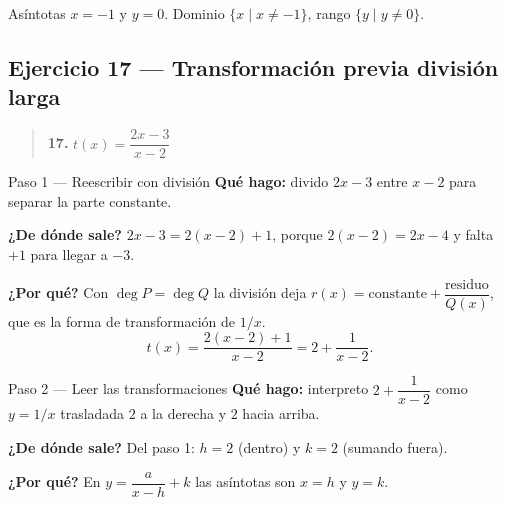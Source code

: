 \documentclass[11pt]{article}
\begin{document}
\begin{center}
\end{center}

\begin{resp}
Asíntotas $x=-1$ y $y=0$. Dominio $\{x\mid x\ne -1\}$, rango $\{y\mid y\ne 0\}$.
\end{resp}

\subsection*{Ejercicio 17 — Transformación previa división larga}

\begin{quote}
\textbf{17.} $t(x)=\dfrac{2x-3}{x-2}$
\end{quote}

\begin{paso}{Paso 1 --- Reescribir con división}
\textbf{Qué hago:} divido $2x-3$ entre $x-2$ para separar la parte constante.

\textbf{¿De dónde sale?} $2x-3=2(x-2)+1$, porque $2(x-2)=2x-4$ y falta $+1$ para llegar a $-3$.

\textbf{¿Por qué?} Con $\deg P=\deg Q$ la división deja $r(x)=\text{constante}+\dfrac{\text{residuo}}{Q(x)}$, que es la forma de transformación de $1/x$.
\[
t(x)=\frac{2(x-2)+1}{x-2}=2+\frac{1}{x-2}.
\]
\end{paso}

\begin{paso}{Paso 2 --- Leer las transformaciones}
\textbf{Qué hago:} interpreto $2+\dfrac{1}{x-2}$ como $y=1/x$ trasladada $2$ a la derecha y $2$ hacia arriba.

\textbf{¿De dónde sale?} Del paso 1: $h=2$ (dentro) y $k=2$ (sumando fuera).

\textbf{¿Por qué?} En $y=\dfrac{a}{x-h}+k$ las asíntotas son $x=h$ y $y=k$.
\end{paso}
\end{document}
